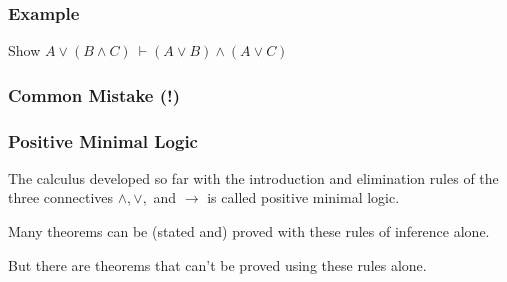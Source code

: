 \documentclass{beamer}
\theoremstyle{indentDefn} \newtheorem{defn}[]{Definition}
\begin{document}
\begin{frame}
  \frametitle{Example}

	Show $A \lor (B \land C) \ \vdash (A \lor B) \land (A \lor C)$
	
	\vspace{7cm}



\end{frame}

\begin{frame}
	\frametitle{Common Mistake (!)}



\end{frame}

\begin{frame}
  \frametitle{Positive Minimal Logic}

    The calculus developed so far with the introduction and elimination rules of the three connectives $\land, \lor,$ and $\to$ is called positive minimal logic. 

    \vspace{0.5cm}

    Many theorems can be (stated and) proved with these rules of inference alone. 

    \vspace{0.5cm}

    But there are theorems that can't be proved using these rules alone. 

\end{frame}
\end{document}
